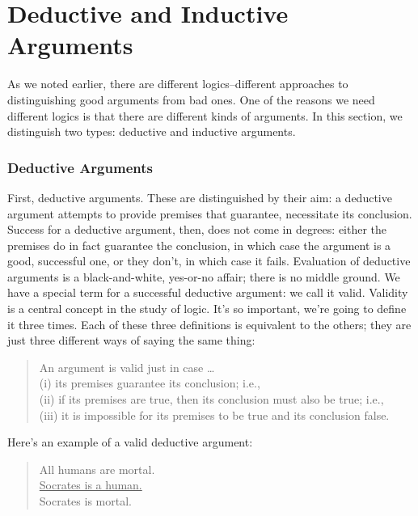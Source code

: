 
\chapter{Deductive and Inductive Arguments}
As we noted earlier, there are different logics--different approaches to distinguishing good
arguments from bad ones. One of the reasons we need different logics is that there are different
kinds of arguments. In this section, we distinguish two types: deductive and inductive arguments.

\subsection{Deductive Arguments}
First, deductive arguments. These are distinguished by their aim: a deductive argument attempts
to provide premises that guarantee, necessitate its conclusion. Success for a deductive argument,
then, does not come in degrees: either the premises do in fact guarantee the conclusion, in which
case the argument is a good, successful one, or they don't, in which case it fails. Evaluation of
deductive arguments is a black-and-white, yes-or-no affair; there is no middle ground.
We have a special term for a successful deductive argument: we call it valid. Validity is a central
concept in the study of logic. It's so important, we're going to define it three times. Each of these
three definitions is equivalent to the others; they are just three different ways of saying the same
thing:

\begin{quote}
An argument is valid just in case \dots \\
(i) its premises guarantee its conclusion; i.e., \\
(ii) if its premises are true, then its conclusion must also be true; i.e., \\
(iii) it is impossible for its premises to be true and its conclusion false. \\
\end{quote}

Here's an example of a valid deductive argument:

\begin{quote}
All humans are mortal. \\
\underline{Socrates is a human.} \\
Socrates is mortal.\\
\end{quote}

